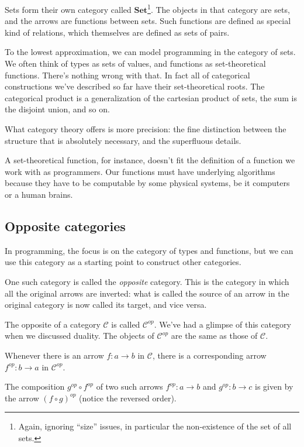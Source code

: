 \documentclass[DaoFP]{subfiles}
\begin{document}
Sets form their own category called $\mathbf{Set}$\footnote{Again, ignoring ``size'' issues, in particular the non-existence of the set of all sets.}. The objects in that category are sets, and the arrows are functions between sets. Such functions are defined as special kind of relations, which themselves are defined as sets of pairs.

To the lowest approximation, we can model programming in the category of sets. We often think of types as sets of values, and functions as set-theoretical functions. There's nothing wrong with that. In fact all of categorical constructions we've described so far have their set-theoretical roots. The categorical product is a generalization of the cartesian product of sets, the sum is the disjoint union, and so on. 

What category theory offers is more precision: the fine distinction between the structure that is absolutely necessary, and the superfluous details. 

A set-theoretical function, for instance, doesn't fit the definition of a function we work with as programmers. Our functions must have underlying algorithms because they have to be computable by some physical systems, be it computers or a human brains. 

\subsection{Opposite categories}
In programming, the focus is on the category of types and functions, but we can use this category as a starting point to construct other categories. 
 
One such category is called the \emph{opposite} category. This is the category in which all the original arrows are inverted: what is called the source of an arrow in the original category is now called its target, and vice versa. 

The opposite of a category $\mathcal{C}$ is called $\mathcal{C}^{op}$. We've had a glimpse of this category when we discussed duality. The objects of $\mathcal{C}^{op}$ are the same as those of $\mathcal{C}$. 

Whenever there is an arrow $f \colon a \to b$ in $\mathcal{C}$, there is a corresponding arrow $f^{op} \colon b \to a$ in $\mathcal{C}^{op}$. 

The composition $g^{op} \circ f^{op}$ of two such arrows $f^{op} \colon a \to b$ and $g^{op} \colon b \to c$ is given by the arrow $(f \circ g)^{op}$ (notice the reversed order).
\end{document}
